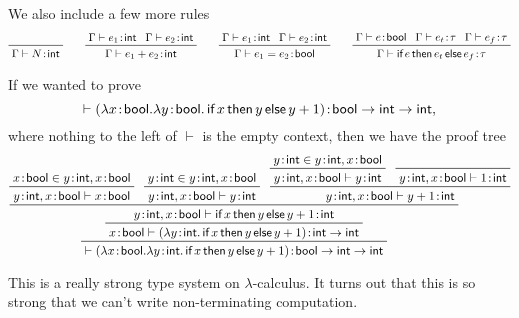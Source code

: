 \documentclass[class=scrartcl]{standalone}
\begin{document}
We also include a few more rules
\[
  \prfaxiom{\Gamma \vdash N \of \pint} \qquad
  \prftree{\Gamma \vdash e_1 \of \pint}
          {\Gamma \vdash e_2 \of \pint}
          {\Gamma \vdash e_1 + e_2 \of \pint} \qquad
  \prftree{\Gamma \vdash e_1 \of \pint}
          {\Gamma \vdash e_2 \of \pint}
          {\Gamma \vdash e_1 = e_2 \of \pbool} \qquad
  \prftree{\Gamma \vdash e \of \pbool}
          {\Gamma \vdash e_t \of \tau}
          {\Gamma \vdash e_f \of \tau}
          {\Gamma \vdash \pifthenelse{e}{e_t}{e_f} \of \tau}
\]

\begin{example}
  If we wanted to prove
  \[
    \vdash (\lambda x {\hspace{0.1111em}:\hspace{0.1111em}} \textsf{bool}. \lambda y {\hspace{0.1111em}:\hspace{0.1111em}}\textsf{bool}. \operatorname{\textsf{if}}{x}\operatorname{\textsf{then}}{y}\operatorname{\textsf{else}}{y+1})
             {\hspace{0.1111em}:\hspace{0.1111em}} \textsf{bool} \to \textsf{int} \to \textsf{int},
  \]
  where nothing to the left of \(\vdash\) is the empty context,
  then we have the proof tree
  \[
    \prftree
    {\prftree
     {\prftree{\prftree{x \of \pbool \in y \of \pint, x \of \pbool}
                       {y \of \pint, x \of \pbool \vdash x \of \pbool}}
              {\prftree{y \of \pint \in y \of \pint, x \of \pbool}
                       {y \of \pint, x \of \pbool \vdash y \of \pint}}
              {\prftree{\prftree{y \of \pint \in y \of \pint, x \of \pbool}
                                {y \of \pint, x \of \pbool \vdash y \of \pint}}
                       {\prfaxiom{y \of \pint, x \of \pbool \vdash 1 \of \pint}}
                       {y \of \pint, x \of \pbool \vdash y+1 \of \pint}}
              {y \of \pint, x \of \pbool \vdash \pifthenelse{x}{y}{y+1} \of \pint}}
     {x \of \pbool \vdash
       (\lambda y \of \pint.
          \pifthenelse{x}{y}{y+1})
       \of \pint \to \pint}}
    {\vdash (\lambda x \of \pbool.
               \lambda y \of \pint.
                 \pifthenelse{x}{y}{y+1})
            \of \pbool \to \pint \to \pint}
  \]
\end{example}

This is a really strong type system on \(\lambda\)-calculus.
It turns out that this is so strong that we can't
write non-terminating computation.
\end{document}
